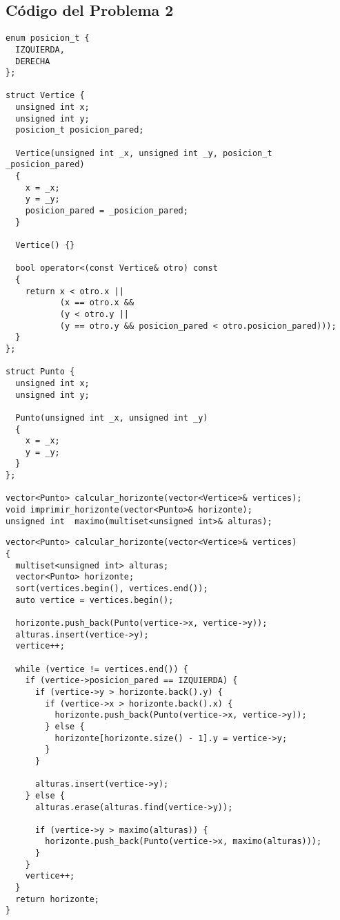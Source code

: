 \documentclass[a4paper]{article}
\begin{document}
\newpage

\subsection{Código del Problema 2}



\begin{lstlisting}
enum posicion_t {
  IZQUIERDA,
  DERECHA
};

struct Vertice {
  unsigned int x;
  unsigned int y;
  posicion_t posicion_pared;

  Vertice(unsigned int _x, unsigned int _y, posicion_t _posicion_pared)
  {
    x = _x;
    y = _y;
    posicion_pared = _posicion_pared;
  }

  Vertice() {}

  bool operator<(const Vertice& otro) const
  {
    return x < otro.x ||
           (x == otro.x &&
           (y < otro.y ||
           (y == otro.y && posicion_pared < otro.posicion_pared)));
  }
};

struct Punto {
  unsigned int x;
  unsigned int y;

  Punto(unsigned int _x, unsigned int _y)
  {
    x = _x;
    y = _y;
  }
};

vector<Punto> calcular_horizonte(vector<Vertice>& vertices);
void imprimir_horizonte(vector<Punto>& horizonte);
unsigned int  maximo(multiset<unsigned int>& alturas);
\end{lstlisting} 

\newpage	

\begin{lstlisting}
vector<Punto> calcular_horizonte(vector<Vertice>& vertices)
{
  multiset<unsigned int> alturas;
  vector<Punto> horizonte;
  sort(vertices.begin(), vertices.end());
  auto vertice = vertices.begin();

  horizonte.push_back(Punto(vertice->x, vertice->y));
  alturas.insert(vertice->y);
  vertice++;

  while (vertice != vertices.end()) {
    if (vertice->posicion_pared == IZQUIERDA) {
      if (vertice->y > horizonte.back().y) {
        if (vertice->x > horizonte.back().x) {
          horizonte.push_back(Punto(vertice->x, vertice->y));
        } else {
          horizonte[horizonte.size() - 1].y = vertice->y;
        }
      }

      alturas.insert(vertice->y);
    } else {
      alturas.erase(alturas.find(vertice->y));
      
      if (vertice->y > maximo(alturas)) {
        horizonte.push_back(Punto(vertice->x, maximo(alturas)));
      }
    }
    vertice++;
  }
  return horizonte;
}
\end{lstlisting}
\end{document}
